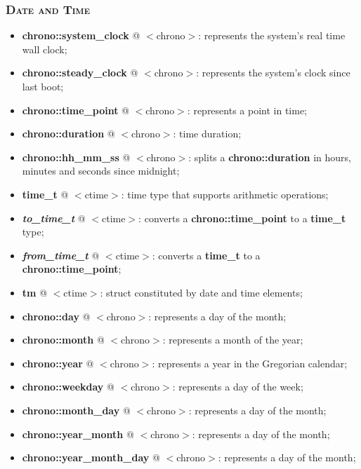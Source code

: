\documentclass[10pt]{article}
\begin{document}
\begin{multicols*}{4}
{{\subsubsection*{\textsc{Date and Time}} 
\begin{itemize}[leftmargin=*,topsep=0.25pt]
  \setlength\itemsep{-1.8pt}
\item  {\textbf{chrono::system\_clock}} @ $<$chrono$>$: represents the system's real time wall clock; 
\item  {\textbf{chrono::steady\_clock}} @ $<$chrono$>$: represents the system's clock since last boot; 
\item  {\textbf{chrono::time\_point}} @ $<$chrono$>$: represents a point in time; 
\item  {\textbf{chrono::duration}} @ $<$chrono$>$: time duration; 
\item  {\textbf{chrono::hh\_mm\_ss}} @ $<$chrono$>$: splits a \textbf{chrono::duration} in hours, minutes and seconds since midnight;
\item  {\textbf{time\_t}} @ $<$ctime$>$: time type that supports arithmetic operations;
\item  \emph{\textbf{to\_time\_t}} @ $<$ctime$>$: converts a \textbf{chrono::time\_point} to a {\textbf{time\_t}} type;
\item  \emph{\textbf{from\_time\_t}} @ $<$ctime$>$: converts a {\textbf{time\_t}} to a \textbf{chrono::time\_point};
\item  \textbf{tm} @ $<$ctime$>$: struct constituted by date and time elements;
\item  {\textbf{chrono::day}} @ $<$chrono$>$: represents a day of the month;
\item  {\textbf{chrono::month}} @ $<$chrono$>$: represents a month of the year;
\item  {\textbf{chrono::year}} @ $<$chrono$>$: represents a year in the Gregorian calendar;
\item  {\textbf{chrono::weekday}} @ $<$chrono$>$: represents a day of the week;
\item  {\textbf{chrono::month\_day}} @ $<$chrono$>$: represents a day of the month;
\item  {\textbf{chrono::year\_month}} @ $<$chrono$>$: represents a day of the month;
\item  {\textbf{chrono::year\_month\_day}} @ $<$chrono$>$: represents a day of the month;
\end{itemize}


}}
\end{multicols*}
\end{document}
